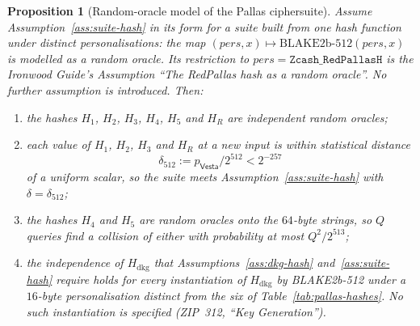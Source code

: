 \documentclass[11pt,a4paper]{article}
\newtheorem{proposition}[theorem]{Proposition}
\theoremstyle{definition}
\newcommand{\Vesta}{\ensuremath{\mathsf{Vesta}}}
\begin{document}
\begin{proposition}[Random-oracle model of the Pallas ciphersuite]
\label{prop:pallas-hash}
Assume Assumption~\ref{ass:suite-hash} in its form for a suite built from
one hash function under distinct personalisations: the map
\((\mathit{pers}, x) \mapsto \mathrm{BLAKE2b\text{-}512}(\mathit{pers}, x)\)
is modelled as a random oracle. Its restriction to
\(\mathit{pers} = \texttt{Zcash\_RedPallasH}\) is the \emph{Ironwood
Guide}'s Assumption ``The RedPallas hash as a random oracle''. No further
assumption is introduced. Then:
\begin{enumerate}
\item[(i)] the hashes \(H_1\), \(H_2\), \(H_3\), \(H_4\), \(H_5\) and \(H_R\)
  are independent random oracles;
\item[(ii)] each value of \(H_1\), \(H_2\), \(H_3\) and \(H_R\) at a new
  input is within statistical distance
  \[
    \delta_{512} := p_{\Vesta} / 2^{512} < 2^{-257}
  \]
  of a uniform scalar, so the suite meets Assumption~\ref{ass:suite-hash}
  with \(\delta = \delta_{512}\);
\item[(iii)] the hashes \(H_4\) and \(H_5\) are random oracles onto the
  \(64\)-byte strings, so \(Q\) queries find a collision of either with
  probability at most \(Q^2 / 2^{513}\);
\item[(iv)] the independence of \(H_{\mathrm{dkg}}\) that
  Assumptions~\ref{ass:dkg-hash} and~\ref{ass:suite-hash} require holds for
  every instantiation of \(H_{\mathrm{dkg}}\) by BLAKE2b-512 under a
  \(16\)-byte personalisation distinct from the six of
  Table~\ref{tab:pallas-hashes}. No such instantiation is specified
  (ZIP~312, ``Key Generation'').
\end{enumerate}
\end{proposition}
\end{document}
